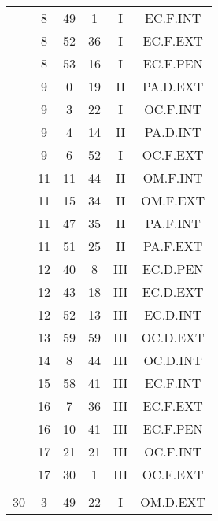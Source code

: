 \documentclass[12pt, a4paper]{article}
\begin{document}
\begin{multicols}{3}
{\begin{tabular}{c c c c c c}
	 	 	 	 & 8 & 49 & 1 & I & EC.F.INT\\%
	 	 	 	 & 8 & 52 & 36 & I & EC.F.EXT\\%
	 	 	 	 & 8 & 53 & 16 & I & EC.F.PEN\\%
	 	 	 	 & 9 & 0 & 19 & II & PA.D.EXT\\%
	 	 	 	 & 9 & 3 & 22 & I & OC.F.INT\\%
	 	 	 	 & 9 & 4 & 14 & II & PA.D.INT\\%
	 	 	 	 & 9 & 6 & 52 & I & OC.F.EXT\\%
	 	 	 	 & 11 & 11 & 44 & II & OM.F.INT\\%
	 	 	 	 & 11 & 15 & 34 & II & OM.F.EXT\\%
	 	 	 	 & 11 & 47 & 35 & II & PA.F.INT\\%
	 	 	 	 & 11 & 51 & 25 & II & PA.F.EXT\\%
	 	 	 	 & 12 & 40 & 8 & III & EC.D.PEN\\%
	 	 	 	 & 12 & 43 & 18 & III & EC.D.EXT\\%
	 	 	 	 & 12 & 52 & 13 & III & EC.D.INT\\%
	 	 	 	 & 13 & 59 & 59 & III & OC.D.EXT\\%
	 	 	 	 & 14 & 8 & 44 & III & OC.D.INT\\%
	 	 	 	 & 15 & 58 & 41 & III & EC.F.INT\\%
	 	 	 	 & 16 & 7 & 36 & III & EC.F.EXT\\%
	 	 	 	 & 16 & 10 & 41 & III & EC.F.PEN\\%
	 	 	 	 & 17 & 21 & 21 & III & OC.F.INT\\%
	 	 	 	 & 17 & 30 & 1 & III & OC.F.EXT\\%
	 	 	 	 & & & & & \\%
	 	 	 	30 & 3 & 49 & 22 & I & OM.D.EXT\\%

\end{tabular}}
\end{multicols}
\end{document}
